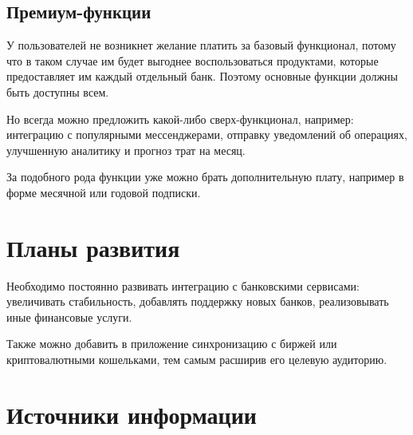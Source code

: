 \documentclass[a4paper,12pt]{article}
\begin{document}
    \subsection{Премиум-функции}

    У пользователей не возникнет желание платить за базовый
    функционал, потому что в таком случае им будет выгоднее воспользоваться
    продуктами, которые предоставляет им каждый отдельный банк. Поэтому основные функции должны быть доступны всем.

    Но всегда можно предложить какой-либо сверх-функционал, например:
    интеграцию с популярными мессенджерами, отправку уведомлений
    об операциях, улучшенную аналитику и прогноз трат на месяц.

    За подобного рода функции уже можно брать дополнительную
    плату, например в форме месячной или годовой подписки.

    \section{Планы развития}

    Необходимо постоянно развивать интеграцию с банковскими
    сервисами: увеличивать стабильность, добавлять поддержку
    новых банков, реализовывать иные финансовые услуги. 

    Также можно добавить в приложение синхронизацию с биржей
    или криптовалютными кошельками, тем самым расширив его целевую аудиторию.
    
    \section{Источники информации}
\end{document}
